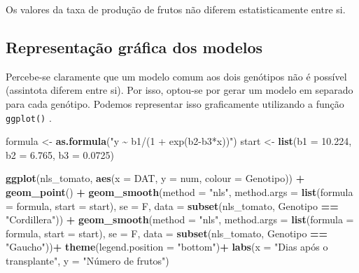 \documentclass[
]{book}
\makeatletter
\newenvironment{Shaded}{\begin{snugshade}}{\end{snugshade}}
\newcommand{\DataTypeTok}[1]{\textcolor[rgb]{0.13,0.29,0.53}{#1}}
\newcommand{\FloatTok}[1]{\textcolor[rgb]{0.00,0.00,0.81}{#1}}
\newcommand{\KeywordTok}[1]{\textcolor[rgb]{0.13,0.29,0.53}{\textbf{#1}}}
\newcommand{\NormalTok}[1]{#1}
\newcommand{\OperatorTok}[1]{\textcolor[rgb]{0.81,0.36,0.00}{\textbf{#1}}}
\newcommand{\StringTok}[1]{\textcolor[rgb]{0.31,0.60,0.02}{#1}}
\numberwithin{equation}{section}
\newcommand{\indf}[1]{\index[function]{#1@\texttt{#1()}|ST}}
\makeatother
\begin{document}
Os valores da taxa de produção de frutos não diferem estatisticamente entre si.

\hypertarget{representauxe7uxe3o-gruxe1fica-dos-modelos}{%
\subsection{Representação gráfica dos modelos}\label{representauxe7uxe3o-gruxe1fica-dos-modelos}}

Percebe-se claramente que um modelo comum aos dois genótipos não é possível (assintota diferem entre si). Por isso, optou-se por gerar um modelo em separado para cada genótipo. Podemos representar isso graficamente utilizando a função \texttt{ggplot()} \indf{ggplot} .

\begin{Shaded}
\begin{Highlighting}[]
\NormalTok{formula \textless{}{-}}\StringTok{ }\KeywordTok{as.formula}\NormalTok{(}\StringTok{"y \textasciitilde{} b1/(1 + exp(b2{-}b3*x))"}\NormalTok{)}
\NormalTok{start \textless{}{-}}\StringTok{ }\KeywordTok{list}\NormalTok{(}\DataTypeTok{b1 =} \FloatTok{10.224}\NormalTok{, }\DataTypeTok{b2 =} \FloatTok{6.765}\NormalTok{, }\DataTypeTok{b3 =} \FloatTok{0.0725}\NormalTok{)}

\KeywordTok{ggplot}\NormalTok{(nls\_tomato, }\KeywordTok{aes}\NormalTok{(}\DataTypeTok{x =}\NormalTok{ DAT, }\DataTypeTok{y =}\NormalTok{ num, }\DataTypeTok{colour =}\NormalTok{ Genotipo)) }\OperatorTok{+}\StringTok{ }
\KeywordTok{geom\_point}\NormalTok{() }\OperatorTok{+}
\KeywordTok{geom\_smooth}\NormalTok{(}\DataTypeTok{method =} \StringTok{"nls"}\NormalTok{, }
            \DataTypeTok{method.args =} \KeywordTok{list}\NormalTok{(}\DataTypeTok{formula =}\NormalTok{ formula, }
                                \DataTypeTok{start =}\NormalTok{ start),}
                                \DataTypeTok{se =}\NormalTok{ F,}
                                \DataTypeTok{data =} \KeywordTok{subset}\NormalTok{(nls\_tomato, Genotipo }\OperatorTok{==}\StringTok{ "Cordillera"}\NormalTok{)) }\OperatorTok{+}
\KeywordTok{geom\_smooth}\NormalTok{(}\DataTypeTok{method =} \StringTok{"nls"}\NormalTok{, }
            \DataTypeTok{method.args =} \KeywordTok{list}\NormalTok{(}\DataTypeTok{formula =}\NormalTok{ formula, }
                                \DataTypeTok{start =}\NormalTok{ start),}
                                \DataTypeTok{se =}\NormalTok{ F,}
                                \DataTypeTok{data =} \KeywordTok{subset}\NormalTok{(nls\_tomato, Genotipo }\OperatorTok{==}\StringTok{ "Gaucho"}\NormalTok{))}\OperatorTok{+}
\KeywordTok{theme}\NormalTok{(}\DataTypeTok{legend.position =} \StringTok{"bottom"}\NormalTok{)}\OperatorTok{+}
\KeywordTok{labs}\NormalTok{(}\DataTypeTok{x =} \StringTok{"Dias após o transplante"}\NormalTok{, }\DataTypeTok{y =} \StringTok{"Número de frutos"}\NormalTok{)}
\end{Highlighting}
\end{Shaded}
\end{document}

